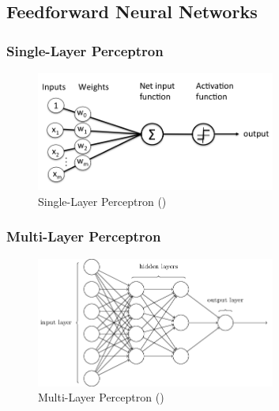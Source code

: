 

\subsection{Feedforward Neural Networks}

\subsubsection{Single-Layer Perceptron}

\begin{figure}[ht!]
\centering
\includegraphics[width=0.7\textwidth]{media/literature/machine_learning/ml_perceptron_single.png}
\caption[Diagram of a single-layer perceptron]{Single-Layer Perceptron (\cite{rosenblatt_perceptron_1958})}
\label{fig:perceptron_single}
\end{figure}


\subsubsection{Multi-Layer Perceptron}

\begin{figure}[ht!]
\centering
\includegraphics[width=0.7\textwidth]{media/literature/machine_learning/ml_perceptron_multi.png}
\caption[Diagram of a multi-layer perceptron]{Multi-Layer Perceptron (\cite{michael_perceptron_2019})}
\label{fig:perceptron_multi}
\end{figure}

